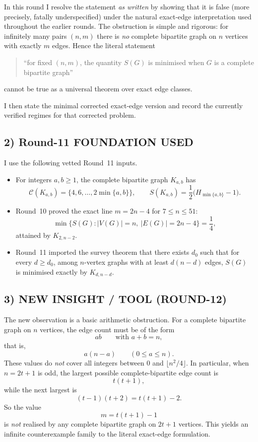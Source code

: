 In this round I resolve the statement \emph{as written} by showing that it is false (more precisely, fatally underspecified) under the natural exact-edge interpretation used throughout the earlier rounds. The obstruction is simple and rigorous: for infinitely many pairs $(n,m)$ there is \emph{no} complete bipartite graph on $n$ vertices with exactly $m$ edges. Hence the literal statement
\begin{quote}
``for fixed $(n,m)$, the quantity $S(G)$ is minimised when $G$ is a complete bipartite graph''
\end{quote}
cannot be true as a universal theorem over exact edge classes.

I then state the minimal corrected exact-edge version and record the currently verified regimes for that corrected problem.

\subsection*{2) Round-11 FOUNDATION USED}

I use the following vetted Round~11 inputs.
\begin{itemize}
\item[(F1)] For integers $a,b\ge 1$, the complete bipartite graph $K_{a,b}$ has
\[
\mathcal C(K_{a,b})=\{4,6,\dots,2\min\{a,b\}\},
\qquad
S(K_{a,b})=\frac12\bigl(H_{\min\{a,b\}}-1\bigr).
\]
\item[(F2)] Round~10 proved the exact line $m=2n-4$ for $7\le n\le 51$:
\[
\min\{S(G): |V(G)|=n,\ |E(G)|=2n-4\}=\frac14,
\]
attained by $K_{2,n-2}$.
\item[(F3)] Round~11 imported the survey theorem that there exists $d_0$ such that for every $d\ge d_0$, among $n$-vertex graphs with at least $d(n-d)$ edges, $S(G)$ is minimised exactly by $K_{d,n-d}$.
\end{itemize}

\subsection*{3) NEW INSIGHT / TOOL (ROUND-12)}

The new observation is a basic arithmetic obstruction.
For a complete bipartite graph on $n$ vertices, the edge count must be of the form
\[
ab
\qquad\text{with }a+b=n,
\]
that is,
\[
a(n-a)\qquad(0\le a\le n).
\]
These values do \emph{not} cover all integers between $0$ and $\lfloor n^2/4\rfloor$.
In particular, when $n=2t+1$ is odd, the largest possible complete-bipartite edge count is
\[
t(t+1),
\]
while the next largest is
\[
(t-1)(t+2)=t(t+1)-2.
\]
So the value
\[
m=t(t+1)-1
\]
is \emph{not} realised by any complete bipartite graph on $2t+1$ vertices.
This yields an infinite counterexample family to the literal exact-edge formulation.

